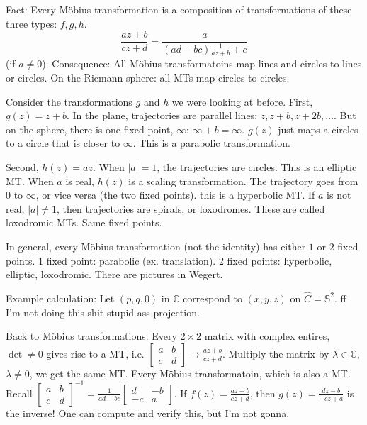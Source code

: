 \documentclass{article}
\theoremstyle{plain}
\theoremstyle{remark}
\newcommand{\C}{{\mathbb C}}
\begin{document}
Fact: Every M\"{o}bius transformation is a composition of
transformations of these three types: $f,g,h$.
\[
	\frac{az + b}{cz + d} = \frac{a}{(ad-bc)\frac{1}{az+b} + c}
\]
(if $a \neq 0$).
Consequence: All M\"{o}bius transformatoins map lines and circles to lines or circles.
On the Riemann sphere: all MTs map circles to circles.

Consider the transformations $g$ and $h$ we were looking at before.
First, $g(z) = z + b$.
In the plane, trajectories are parallel lines:
$z, z+ b, z+ 2b, \dots$.
But on the sphere, there is one fixed point, $\infty$:
$\infty + b = \infty$.
$g(z)$ just maps a circles to a circle that is closer to $\infty$.
This is a parabolic transformation.

Second, $h(z) = az$.
When $|a| = 1$, the trajectories are circles.
This is an elliptic MT.
When $a$ is real, $h(z)$ is a scaling transformation.
The trajectory goes from $0$ to $\infty$, or vice versa (the two fixed points).
this is a hyperbolic MT.
If $a$ is not real, $|a| \neq 1$, then trajectories are spirals,
or loxodromes.
These are called loxodromic MTs.
Same fixed points.

In general, every M\"{o}bius transformation (not the identity)
has either $1$ or $2$ fixed points.
1 fixed point: parabolic (ex. translation).
2 fixed points: hyperbolic, elliptic, loxodromic.
There are pictures in Wegert.

Example calculation:
Let $(p,q,0)$ in $\C$ correspond to $(x,y,z)$ on $\hat{C} = \mathbb{S}^2$.
ff I'm not doing this shit stupid ass projection.

Back to M\"{o}bius transformations:
Every $2 \times 2$ matrix with complex entires, $\det \neq 0$ gives rise to a MT,
i.e. $\begin{bmatrix} a & b \\ c & d \end{bmatrix} \to \frac{az + b}{cz + d}$.
Multiply the matrix by $\lambda \in \C$, $\lambda \neq 0$, we get the same MT.
Every M\"{o}bius transformatoin, which is also a MT.
Recall $\begin{bmatrix} a & b \\ c & d \end{bmatrix}^{-1}
= \frac{1}{ad-bc}\begin{bmatrix} d & -b \\ -c & a \end{bmatrix}$.
If $f(z) = \frac{az + b}{cz + d}$,
then $g(z) = \frac{dz - b}{-cz + a}$ is the inverse!
One can compute and verify this, but I'm not gonna.
\end{document}
